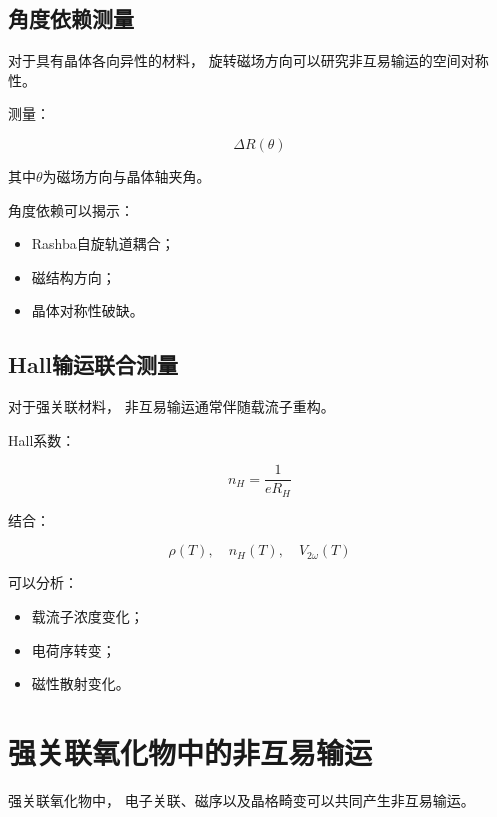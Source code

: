 \documentclass[10.5pt]{article}
\begin{document}
\subsection{角度依赖测量}


对于具有晶体各向异性的材料，
旋转磁场方向可以研究非互易输运的空间对称性。


测量：

\begin{equation}
\Delta R(\theta)
\end{equation}


其中$\theta$为磁场方向与晶体轴夹角。


角度依赖可以揭示：

\begin{itemize}
\item Rashba自旋轨道耦合；
\item 磁结构方向；
\item 晶体对称性破缺。
\end{itemize}



\subsection{Hall输运联合测量}


对于强关联材料，
非互易输运通常伴随载流子重构。


Hall系数：

\begin{equation}
n_H=
\frac{1}{eR_H}
\end{equation}


结合：

\begin{equation}
\rho(T),
\quad
n_H(T),
\quad
V_{2\omega}(T)
\end{equation}


可以分析：

\begin{itemize}
\item 载流子浓度变化；
\item 电荷序转变；
\item 磁性散射变化。
\end{itemize}



\section{强关联氧化物中的非互易输运}


强关联氧化物中，
电子关联、磁序以及晶格畸变可以共同产生非互易输运。
\end{document}

